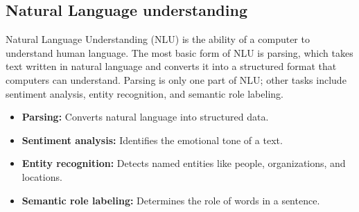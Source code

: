 \subsection{Natural Language understanding}

Natural Language Understanding (NLU) is the ability of a computer to understand human language. The most basic form of NLU is parsing, which takes text written in natural language and converts it into a structured format that computers can understand. Parsing is only one part of NLU; other tasks include sentiment analysis, entity recognition, and semantic role labeling.

\begin{itemize}
    \item \textbf{Parsing:} Converts natural language into structured data.
    \item \textbf{Sentiment analysis:} Identifies the emotional tone of a text.
    \item \textbf{Entity recognition:} Detects named entities like people, organizations, and locations.
    \item \textbf{Semantic role labeling:} Determines the role of words in a sentence.
\end{itemize}